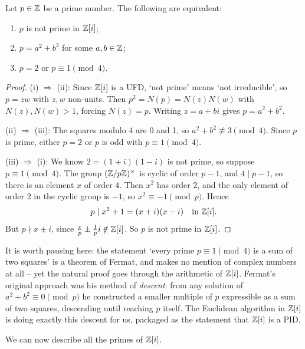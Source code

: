 \documentclass[a4paper]{scrartcl}
\begin{document}
\begin{proposition}
	Let $p \in \mathbb{Z}$ be a prime number. The following are equivalent:
	\begin{enumerate}[label=(\roman*)]
		\item $p$ is not prime in $\mathbb{Z}[i]$;
		\item $p = a^2 + b^2$ for some $a, b \in \mathbb{Z}$;
		\item $p = 2$ or $p \equiv 1 \pmod 4$.
	\end{enumerate}
\end{proposition}
\begin{proof}
	(i) $\Rightarrow$ (ii): Since $\mathbb{Z}[i]$ is a UFD, `not prime' means `not irreducible', so $p = zw$ with $z, w$ non-units. Then $p^2 = N(p) = N(z)N(w)$ with $N(z), N(w) > 1$, forcing $N(z) = p$. Writing $z = a + bi$ gives $p = a^2 + b^2$.

	(ii) $\Rightarrow$ (iii): The squares modulo 4 are 0 and 1, so $a^2 + b^2 \not\equiv 3 \pmod 4$. Since $p$ is prime, either $p = 2$ or $p$ is odd with $p \equiv 1 \pmod 4$.

	(iii) $\Rightarrow$ (i): We know $2 = (1+i)(1-i)$ is not prime, so suppose $p \equiv 1 \pmod 4$. The group $(\mathbb{Z}/p\mathbb{Z})^{\times}$ is cyclic of order $p - 1$, and $4 \mid p - 1$, so there is an element $x$ of order 4. Then $x^2$ has order 2, and the only element of order 2 in the cyclic group is $-1$, so $x^2 \equiv -1 \pmod p$. Hence
	$$
	p \mid x^2 + 1 = (x + i)(x - i) \quad \text{in } \mathbb{Z}[i].
	$$
	But $p \nmid x \pm i$, since $\frac{x}{p} \pm \frac{1}{p}i \notin \mathbb{Z}[i]$. So $p$ is not prime in $\mathbb{Z}[i]$.
\end{proof}

It is worth pausing here: the statement `every prime $p \equiv 1 \pmod 4$ is a sum of two squares' is a theorem of Fermat, and makes no mention of complex numbers at all -- yet the natural proof goes through the arithmetic of $\mathbb{Z}[i]$. Fermat's original approach was his method of \emph{descent}: from any solution of $a^2 + b^2 \equiv 0 \pmod p$ he constructed a smaller multiple of $p$ expressible as a sum of two squares, descending until reaching $p$ itself. The Euclidean algorithm in $\mathbb{Z}[i]$ is doing exactly this descent for us, packaged as the statement that $\mathbb{Z}[i]$ is a PID.

We can now describe all the primes of $\mathbb{Z}[i]$.
\end{document}
